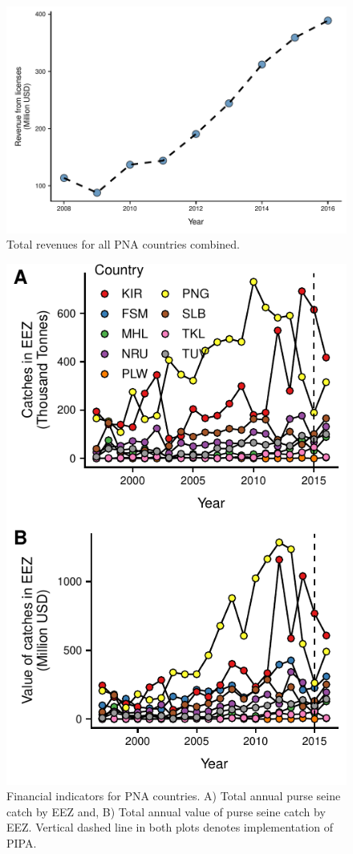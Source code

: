\documentclass[9p,twocolumn,twoside,lineno]{pnas-new}
\begin{document}
\begin{figure}[H]
\centering
	\includegraphics{img/total_PNA_revenues.pdf}
	\caption{\label{fig:total_PNA_revenues}Total revenues for all PNA countries combined.}
\end{figure}

\begin{figure}[H]
\centering
	\includegraphics{img/catches.pdf}
	\caption{\label{fig:catches}Financial indicators for PNA countries. A) Total annual purse seine catch by EEZ and, B) Total annual value of purse seine catch by EEZ. Vertical dashed line in both plots denotes implementation of PIPA.}
\end{figure}
\end{document}
